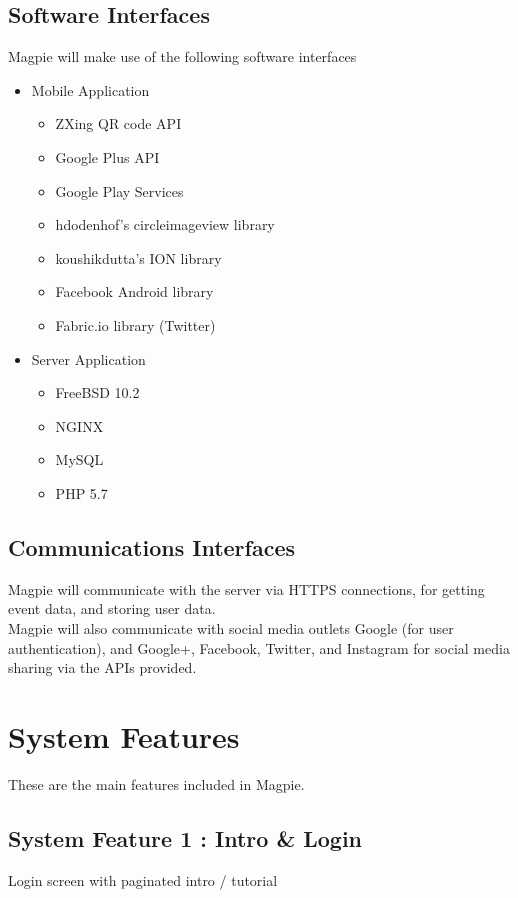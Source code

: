 \documentclass{scrreprt}
\begin{document}
\section{Software Interfaces}
Magpie will make use of the following software interfaces
\begin{itemize}
  \item Mobile Application
  \begin{itemize}
    \item ZXing QR code API
    \item Google Plus API
    \item Google Play Services
    \item hdodenhof's circleimageview library
    \item koushikdutta's ION library
    \item Facebook Android library
    \item Fabric.io library (Twitter)
  \end{itemize}
  \item Server Application
  \begin{itemize}
    \item FreeBSD 10.2
    \item NGINX
    \item MySQL
    \item PHP 5.7
  \end{itemize}
\end{itemize}

\section{Communications Interfaces}
Magpie will communicate with the server via HTTPS connections, for getting event
data, and storing user data. \\
Magpie will also communicate with social media outlets Google (for user authentication),
and Google+, Facebook, Twitter, and Instagram for social media sharing via the
APIs provided.

\chapter{System Features}
These are the main features included in Magpie.

\section{System Feature 1 : Intro \& Login}
Login screen with paginated intro / tutorial
\end{document}
